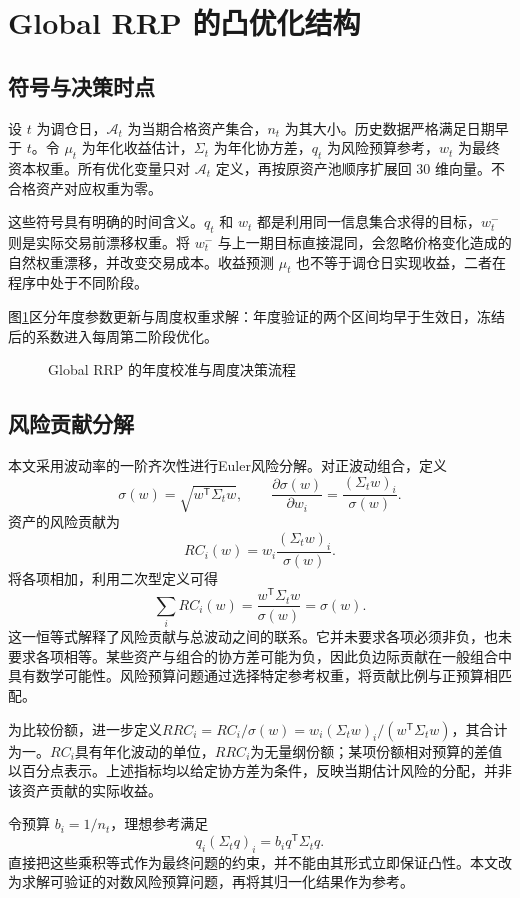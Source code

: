 \clearpage
\section{Global RRP 的凸优化结构}
\subsection{符号与决策时点}
设 $t$ 为调仓日，$\mathcal A_t$ 为当期合格资产集合，$n_t$ 为其大小。历史数据严格满足日期早于 $t$。令 $\mu_t$ 为年化收益估计，$\Sigma_t$ 为年化协方差，$q_t$ 为风险预算参考，$w_t$ 为最终资本权重。所有优化变量只对 $\mathcal A_t$ 定义，再按原资产池顺序扩展回 30 维向量。不合格资产对应权重为零。

这些符号具有明确的时间含义。$q_t$ 和 $w_t$ 都是利用同一信息集合求得的目标，$w_t^-$ 则是实际交易前漂移权重。将 $w_t^-$ 与上一期目标直接混同，会忽略价格变化造成的自然权重漂移，并改变交易成本。收益预测 $\mu_t$ 也不等于调仓日实现收益，二者在程序中处于不同阶段。

图\ref{fig:model_workflow}区分年度参数更新与周度权重求解：年度验证的两个区间均早于生效日，冻结后的系数进入每周第二阶段优化。
\begin{figure}[htbp]
\centering

\caption{Global RRP 的年度校准与周度决策流程}
\label{fig:model_workflow}
\end{figure}

\subsection{风险贡献分解}
本文采用波动率的一阶齐次性进行Euler风险分解\cite{tasche2008euler,roncalli2013introduction}。对正波动组合，定义
\[
\sigma(w)=\sqrt{w^\mathsf T\Sigma_t w},\qquad
\frac{\partial\sigma(w)}{\partial w_i}=\frac{(\Sigma_t w)_i}{\sigma(w)}.
\]
资产的风险贡献为
\[
RC_i(w)=w_i\frac{(\Sigma_t w)_i}{\sigma(w)}.
\]
将各项相加，利用二次型定义可得
\[
\sum_i RC_i(w)=\frac{w^\mathsf T\Sigma_t w}{\sigma(w)}=\sigma(w).
\]
这一恒等式解释了风险贡献与总波动之间的联系。它并未要求各项必须非负，也未要求各项相等。某些资产与组合的协方差可能为负，因此负边际贡献在一般组合中具有数学可能性。风险预算问题通过选择特定参考权重，将贡献比例与正预算相匹配。

为比较份额，进一步定义$RRC_i=RC_i/\sigma(w)=w_i(\Sigma_t w)_i/(w^\mathsf T\Sigma_t w)$，其合计为一。$RC_i$具有年化波动的单位，$RRC_i$为无量纲份额；某项份额相对预算的差值以百分点表示。上述指标均以给定协方差为条件，反映当期估计风险的分配，并非该资产贡献的实际收益。

令预算 $b_i=1/n_t$，理想参考满足
\[
q_i(\Sigma_t q)_i=b_i q^\mathsf T\Sigma_t q.
\]
直接把这些乘积等式作为最终问题的约束，并不能由其形式立即保证凸性。本文改为求解可验证的对数风险预算问题，再将其归一化结果作为参考。

